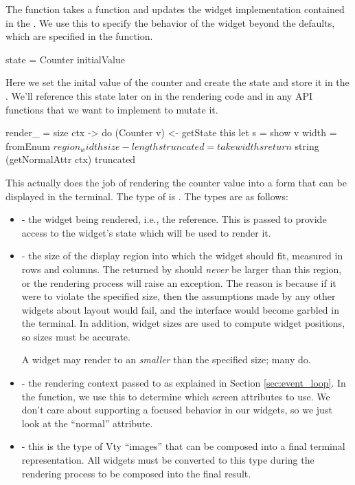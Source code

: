 The  function takes a function  and updates the widget implementation contained in the
.  We use this to specify the behavior of the widget beyond
the defaults, which are specified in the  function.

\begin{haskellcode}
 state = Counter initialValue
\end{haskellcode}

Here we set the inital value of the counter and create the
 state and store it in the .  We'll
reference this state later on in the rendering code and in any API
functions that we want to implement to mutate it.

\begin{haskellcode}
 render_ =
   \this size ctx -> do
     (Counter v) <- getState this
     let s = show v
         width = fromEnum $ region_width size - length s
         truncated = take width s
     return $ string (getNormalAttr ctx) truncated
\end{haskellcode}

This actually does the job of rendering the counter value into a form
that can be displayed in the terminal.  The type of  is
.  The
types are as follows:

\begin{itemize}
\item {} - the widget being rendered, i.e., the  reference.  This is passed to provide access to the
  widget's state which will be used to render it.
\item {} - the size of the display region into which
  the widget should fit, measured in rows and columns.  The 
  returned by  should \textit{never} be larger than this
  region, or the rendering process will raise an exception.  The
  reason is because if it were to violate the specified size, then the
  assumptions made by any other widgets about layout would fail, and
  the interface would become garbled in the terminal.  In addition,
  widget sizes are used to compute widget positions, so sizes must be
  accurate.

  A widget may render to an  \textit{smaller} than the
  specified size; many do.
\item {} - the rendering context passed to 
  as explained in Section \ref{sec:event_loop}.  In the 
  function, we use this to determine which screen attributes to use.
  We don't care about supporting a focused behavior in our
   widgets, so we just look at the ``normal'' attribute.
\item {} - this is the type of Vty ``images'' that can be
  composed into a final terminal representation.  All widgets must be
  converted to this type during the rendering process to be composed
  into the final result.
\end{itemize}

